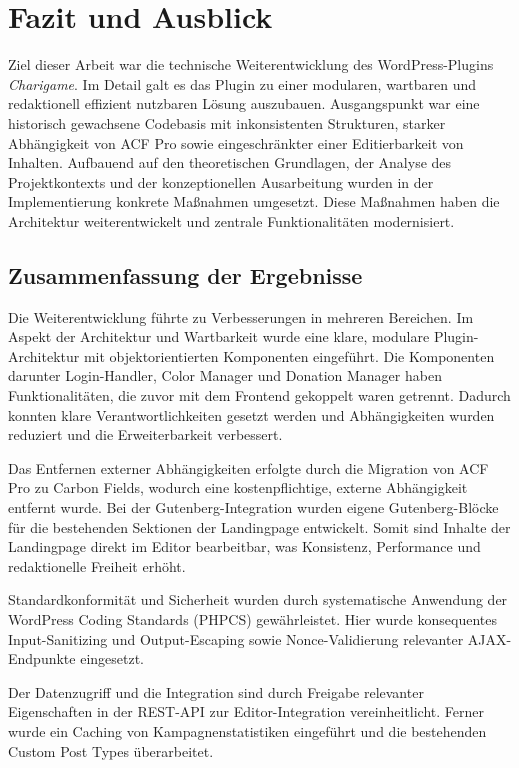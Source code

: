 \chapter{Fazit und Ausblick}
\label{ch:fazit-und-ausblick}

Ziel dieser Arbeit war die technische Weiterentwicklung des WordPress-Plugins \textit{Charigame}.
Im Detail galt es das Plugin zu einer modularen, wartbaren und redaktionell effizient nutzbaren Lösung auszubauen.
Ausgangspunkt war eine historisch gewachsene Codebasis mit inkonsistenten Strukturen, starker Abhängigkeit von ACF Pro sowie eingeschränkter einer Editierbarkeit von Inhalten.
Aufbauend auf den theoretischen Grundlagen, der Analyse des Projektkontexts und der konzeptionellen Ausarbeitung wurden in der Implementierung konkrete Maßnahmen umgesetzt.
Diese Maßnahmen haben die Architektur weiterentwickelt und zentrale Funktionalitäten modernisiert.

\section{Zusammenfassung der Ergebnisse}
Die Weiterentwicklung führte zu Verbesserungen in mehreren Bereichen.
Im Aspekt der Architektur und Wartbarkeit wurde eine klare, modulare Plugin-Architektur mit objektorientierten Komponenten eingeführt.
Die Komponenten darunter Login-Handler, Color Manager und Donation Manager haben Funktionalitäten, die zuvor mit dem Frontend gekoppelt waren getrennt.
Dadurch konnten klare Verantwortlichkeiten gesetzt werden und Abhängigkeiten wurden reduziert und die Erweiterbarkeit verbessert.

Das Entfernen externer Abhängigkeiten erfolgte durch die Migration von ACF Pro zu Carbon Fields, wodurch eine kostenpflichtige, externe Abhängigkeit entfernt wurde.
Bei der Gutenberg-Integration wurden eigene Gutenberg-Blöcke für die bestehenden Sektionen der Landingpage entwickelt.
Somit sind Inhalte der Landingpage direkt im Editor bearbeitbar, was Konsistenz, Performance und redaktionelle Freiheit erhöht.

Standardkonformität und Sicherheit wurden durch systematische Anwendung der WordPress Coding Standards (PHPCS) gewährleistet.
Hier wurde konsequentes Input-Sanitizing und Output-Escaping sowie Nonce-Validierung relevanter AJAX-Endpunkte eingesetzt.

Der Datenzugriff und die Integration sind durch Freigabe relevanter Eigenschaften in der REST-API zur Editor-Integration vereinheitlicht.
Ferner wurde ein Caching von Kampagnenstatistiken eingeführt und die bestehenden Custom Post Types überarbeitet.

